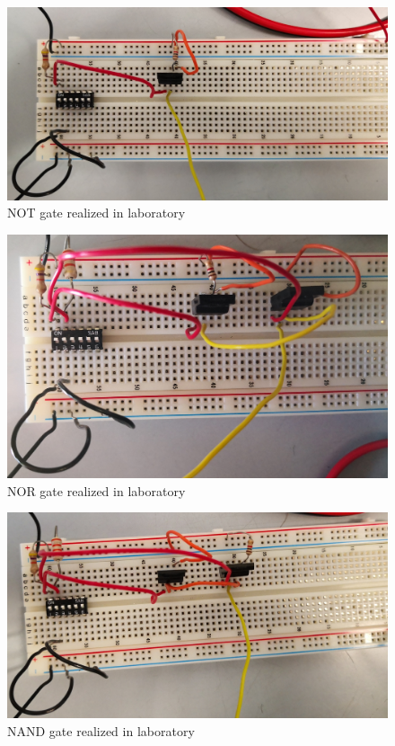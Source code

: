 \documentclass{article}
\begin{document}
\begin{figure}[h]
  \centering
  \includegraphics[scale=.08]{IM_NOT_LAB.jpg}
  \caption{NOT gate realized in laboratory}
  \label{NOT_LAB}
\end{figure}

\begin{figure}[h]
  \centering
  \includegraphics[scale=.08]{IM_NOR_LAB.jpg}
  \caption{NOR gate realized in laboratory}
  \label{NOR_LAB}
\end{figure}

\begin{figure}[h]
  \centering
  \includegraphics[scale=.08]{IM_NAND_LAB.jpg}
  \caption{NAND gate realized in laboratory}
  \label{NAND_LAB}
\end{figure}




 
\end{document}

